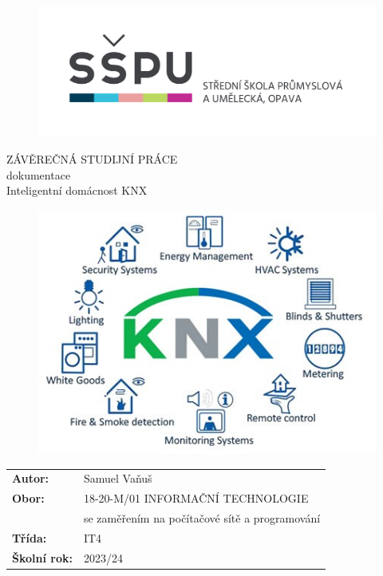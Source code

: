 \documentclass[12pt, a4paper,
twoside,        %
openright
]{report}
\title{\nazevPrace} %
\author{\jmenoAutora} %
\date{\datumOdevzdani} %
\newcommand\obor{INFORMAČNÍ TECHNOLOGIE} %
\newcommand\kodOboru{18-20-M/01} %
\newcommand\zamereni{se zaměřením na počítačové sítě a programování} %
\newcommand\trida{IT4} %
\newcommand\jmenoAutora{Samuel Vaňuš}  %
\newcommand\skolniRok{2023/24} %
\newcommand\nazevPrace{Inteligentní domácnost KNX} %
\begin{document}
	
	\pagestyle{empty}
	
	\cleardoublepage

	
	{\selectfont
		\begin{figure}[h]
			\centering
			\includegraphics[width=0.6\linewidth]{image/logo-skoly.png} 
		\end{figure}
		
		
		{\bfseries %
			\begin{center}
				\vspace{0.025 \textheight}
				\LARGE{ZÁVĚREČNÁ STUDIJNÍ PRÁCE}\\
				\large{dokumentace}\\
				\vspace{0.075 \textheight}
				\LARGE {\nazevPrace}\\
			\end{center}  
		}%
		
		\begin{figure}[h]
			\centering
			\includegraphics[width=0.6\linewidth]{image/smart_home.jpg} 
		\end{figure}
		
		\vspace{0.02 \textheight}
		\begin{table}[h!]
			\begin{tabular}{ll}
				\textbf{Autor:} & \jmenoAutora\\ 
				\textbf{Obor:} & \kodOboru { } \obor\\
				\textbf{} & \zamereni\\
				\textbf{Třída:} & \trida\\
				\textbf{Školní rok:} & \skolniRok\\
			\end{tabular}
			
		\end{table}		
	}
	
\end{document}
